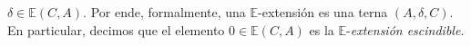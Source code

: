 \documentclass[preview]{standalone}
\begin{document}
\begin{center}
$\delta\in\mathbb{E}(C,A)$. Por ende, formalmente, una $\mathbb{E}$-extensión es una terna $(A,\delta,C)$. En particular, decimos que el elemento $0\in\mathbb{E}(C,A)$ es la $\mathbb{E}$-\emph{extensión escindible}.
\end{center}
\end{document}
